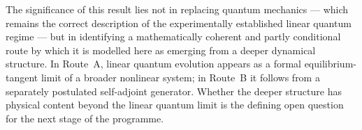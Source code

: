 \documentclass[12pt]{article}
\begin{document}
The significance of this result lies not in replacing quantum mechanics --- which remains the correct description of the experimentally established linear quantum regime --- but in identifying a mathematically coherent and partly conditional route by which it is modelled here as emerging from a deeper dynamical structure. In Route~A, linear quantum evolution appears as a formal equilibrium-tangent limit of a broader nonlinear system; in Route~B it follows from a separately postulated self-adjoint generator. Whether the deeper structure has physical content beyond the linear quantum limit is the defining open question for the next stage of the programme.



\end{document}
